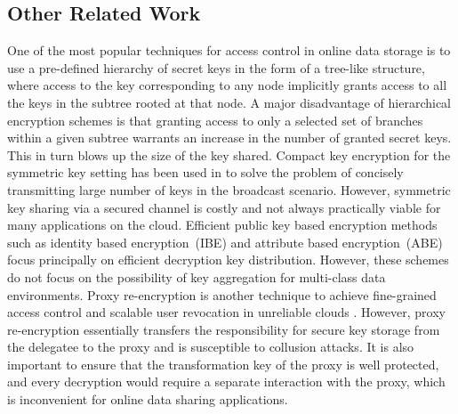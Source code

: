 \subsection{Other Related Work}
\label{subsec:relwork}

% 
% 
% 
% 
One of the most popular techniques for access control in online data storage is to use a pre-defined hierarchy of secret keys \cite{ateniese2012provably} in the form of a tree-like structure, where access to the key corresponding to any node implicitly grants access to all the keys in the subtree rooted at that node. A major disadvantage of hierarchical encryption schemes is that granting access to only a selected set of branches within a given subtree warrants an increase in the number of granted secret keys. This in turn blows up the size of the key shared. Compact key encryption for the symmetric key setting has been used in \cite{benaloh2009patient} to solve the problem of concisely transmitting  large number of keys in the broadcast scenario. However, symmetric key sharing via a secured channel is costly and not always practically viable for many applications on the cloud. Efficient public key based encryption methods such as identity based encryption~(IBE) \cite{boneh2003identity} and attribute based encryption~(ABE) \cite{goyal2006attribute} focus principally on efficient decryption key distribution. However, these schemes do not focus on the possibility of key aggregation for multi-class data environments. Proxy re-encryption is another technique to achieve fine-grained access control and scalable user revocation in unreliable clouds \cite{ateniese2006improved}. However, proxy re-encryption essentially transfers the responsibility for secure key storage from the delegatee to the proxy and is susceptible to collusion attacks. It is also important to ensure that the transformation key of the proxy is well protected, and every decryption would require a separate interaction with the proxy, which is inconvenient for online data sharing applications.
